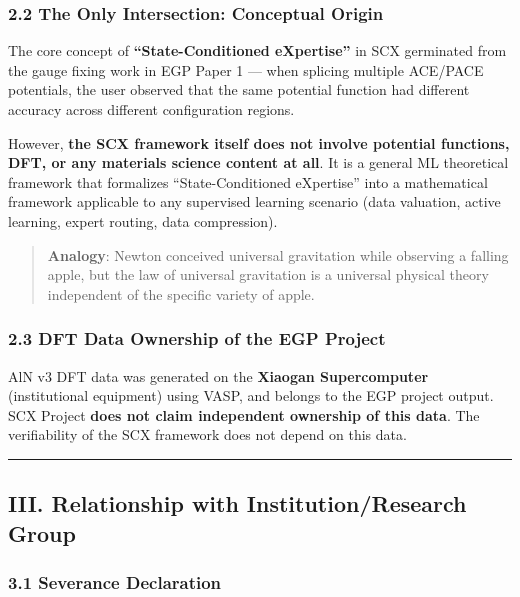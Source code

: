 \documentclass[
  12pt,
]{article}
\begin{document}
\subsubsection{2.2 The Only Intersection: Conceptual Origin}\label{the-only-intersection-conceptual-origin}

The core concept of \textbf{``State-Conditioned eXpertise''} in SCX germinated from the gauge fixing work in EGP Paper 1 --- when splicing multiple ACE/PACE potentials, the user observed that the same potential function had different accuracy across different configuration regions.

However, \textbf{the SCX framework itself does not involve potential functions, DFT, or any materials science content at all}. It is a general ML theoretical framework that formalizes ``State-Conditioned eXpertise'' into a mathematical framework applicable to any supervised learning scenario (data valuation, active learning, expert routing, data compression).

\begin{quote}
\textbf{Analogy}: Newton conceived universal gravitation while observing a falling apple, but the law of universal gravitation is a universal physical theory independent of the specific variety of apple.
\end{quote}

\subsubsection{2.3 DFT Data Ownership of the EGP Project}\label{dft-data-ownership-of-the-egp-project}

AlN v3 DFT data was generated on the \textbf{Xiaogan Supercomputer} (institutional equipment) using VASP, and belongs to the EGP project output. SCX Project \textbf{does not claim independent ownership of this data}. The verifiability of the SCX framework does not depend on this data.

\begin{center}\rule{0.5\linewidth}{0.5pt}\end{center}

\subsection{III. Relationship with Institution/Research Group}\label{iii-relationship-with-institutionresearch-group}

\subsubsection{3.1 Severance Declaration}\label{severance-declaration}
\end{document}
